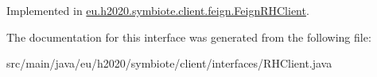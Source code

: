 Implemented in \hyperlink{classeu_1_1h2020_1_1symbiote_1_1client_1_1feign_1_1FeignRHClient_ae87c958e721ee8f5144822c10dd40095}{eu.\+h2020.\+symbiote.\+client.\+feign.\+Feign\+R\+H\+Client}.



The documentation for this interface was generated from the following file\+:\begin{DoxyCompactItemize}
\item 
src/main/java/eu/h2020/symbiote/client/interfaces/R\+H\+Client.\+java\end{DoxyCompactItemize}
